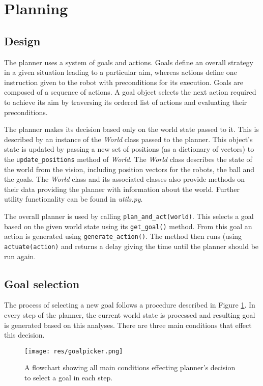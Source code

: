 \section{Planning}

\subsection{Design}

The planner uses a system of goals and actions. Goals define an overall
strategy in a given situation leading to a particular aim, whereas actions
define one instruction given to the robot with preconditions for its execution.
Goals are composed of a sequence of actions. A goal object selects the next
action required to achieve its aim by traversing its ordered list of actions
and evaluating their preconditions.

The planner makes its decision based only on the world state passed to it. This
is described by an instance of the \emph{World} class passed to the planner.
This object's state is updated by passing a new set of positions (as a
dictionary of vectors) to the \texttt{update\_positions} method of
\emph{World}. The \emph{World} class describes the state of the world from the
vision, including position vectors for the robots, the ball and the goals. The
\emph{World} class and its associated classes also provide methods on their
data providing the planner with information about the world. Further utility
functionality can be found in \emph{utils.py}.

The overall planner is used by calling \texttt{plan\_and\_act(world)}. This
selects a goal based on the given world state using its \texttt{get\_goal()}
method. From this goal an action is generated using
\texttt{generate\_action()}. The method then runs (using
\texttt{actuate(action)} and returns a delay giving the time until the planner
should be run again.

\subsection{Goal selection}

The process of selecting a new goal follows a procedure described in Figure
\ref{fig:goalpicker}. In every step of the planner, the current world state is
processed and resulting goal is generated based on this analyses. There are
three main conditions that effect this decision.


\begin{figure}[H]
	\begin{center}
    \texttt{[image: res/goalpicker.png]}
    \caption{A flowchart showing all main conditions effecting planner's decision to select a goal in each step.}
    \label{fig:goalpicker}
	\end{center}
\end{figure}

